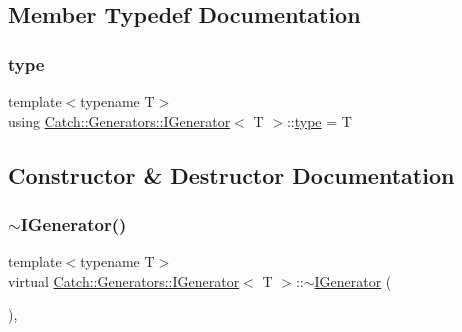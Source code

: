 \subsection{Member Typedef Documentation}
\mbox{\label{struct_catch_1_1_generators_1_1_i_generator_a1f8677875fe0ff31f39c60d45504b9a5}} 
\subsubsection{\texorpdfstring{type}{type}}
{\footnotesize\ttfamily template$<$typename T$>$ \\
using \mbox{\hyperlink{struct_catch_1_1_generators_1_1_i_generator}{Catch\+::\+Generators\+::\+I\+Generator}}$<$ T $>$\+::\mbox{\hyperlink{struct_catch_1_1_generators_1_1_i_generator_a1f8677875fe0ff31f39c60d45504b9a5}{type}} =  T}



\subsection{Constructor \& Destructor Documentation}
\mbox{\label{struct_catch_1_1_generators_1_1_i_generator_afe5b6eecbbd735e69748d68574611747}} 
\subsubsection{\texorpdfstring{$\sim$IGenerator()}{~IGenerator()}}
{\footnotesize\ttfamily template$<$typename T$>$ \\
virtual \mbox{\hyperlink{struct_catch_1_1_generators_1_1_i_generator}{Catch\+::\+Generators\+::\+I\+Generator}}$<$ T $>$\+::$\sim$\mbox{\hyperlink{struct_catch_1_1_generators_1_1_i_generator}{I\+Generator}} (\begin{DoxyParamCaption}{ }\end{DoxyParamCaption})\hspace{0.3cm}{\ttfamily [virtual]}, {\ttfamily [default]}}



